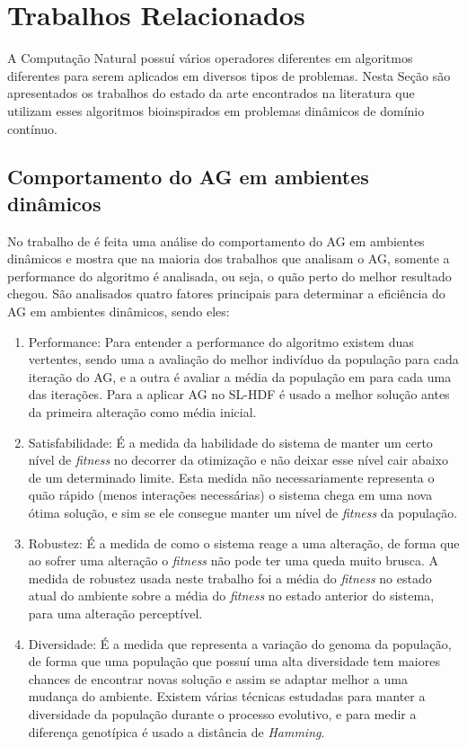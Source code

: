 \chapter{Trabalhos Relacionados}
\label{ch:relacionados}
A Computação Natural possuí vários operadores diferentes em algoritmos diferentes para serem aplicados em diversos tipos de problemas. Nesta Seção são apresentados os trabalhos do estado da arte encontrados na literatura que utilizam esses algoritmos bioinspirados em problemas dinâmicos de domínio contínuo.

\section{Comportamento do AG em ambientes dinâmicos}
\label{sec:ag_behaviour}

No trabalho de \cite{rand2005measurements} é feita uma análise do comportamento do AG em ambientes dinâmicos e mostra que na maioria dos trabalhos que analisam o AG, somente a performance do algoritmo é analisada, ou seja, o quão perto do melhor resultado chegou. São analisados quatro fatores principais para determinar a eficiência do AG em ambientes dinâmicos, sendo eles:

\begin{enumerate}
\item Performance: Para entender a performance do algoritmo existem duas vertentes, sendo uma a avaliação do melhor indivíduo da população para cada iteração do AG, e a outra é avaliar a média da população em para cada uma das iterações. Para a aplicar AG no SL-HDF é usado a melhor solução antes da primeira alteração como média inicial.

\item Satisfabilidade: É a medida da habilidade do sistema de manter um certo nível de \textit{fitness} no decorrer da otimização e não deixar esse nível cair abaixo de um determinado limite. Esta medida não necessariamente representa o quão rápido (menos interações necessárias) o sistema chega em uma nova ótima solução, e sim se ele consegue manter um nível de \textit{fitness} da população.

\item Robustez: É a medida de como o sistema reage a uma alteração, de forma que ao sofrer uma alteração o \textit{fitness} não pode ter uma queda muito brusca. A medida de robustez usada neste trabalho foi a média do \textit{fitness} no estado atual do ambiente sobre a média do \textit{fitness} no estado anterior do sistema, para uma alteração perceptível.

\item Diversidade: É a medida que representa a variação do genoma da população, de forma que uma população que possuí uma alta diversidade tem maiores chances de encontrar novas solução e assim se adaptar melhor a uma mudança do ambiente. Existem várias técnicas estudadas para manter a diversidade da população durante o processo evolutivo, e para medir a diferença genotípica é usado a distância de \textit{Hamming}.
\end{enumerate}

